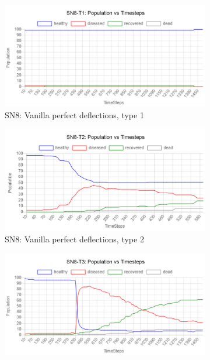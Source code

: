 \documentclass[a4paper,11pt]{article}
\begin{document}
    \begin{figure}[H]
        \centering
        \begin{subfigure}[b]{0.49\linewidth}
            \includegraphics[width=\linewidth]{pop_graphs/SN8-T1_pop.jpg}
            \caption{SN8: Vanilla perfect deflections, type 1}
            \label{fig:SN8T1}
        \end{subfigure}
        \begin{subfigure}[b]{0.49\linewidth}
            \includegraphics[width=\linewidth]{pop_graphs/SN8-T2_pop.jpg}
            \caption{SN8: Vanilla perfect deflections, type 2}
            \label{fig:SN8T2}
        \end{subfigure}
        \begin{subfigure}[b]{0.49\linewidth}
            \includegraphics[width=\linewidth]{pop_graphs/SN8-T3_pop.jpg}

\end{subfigure}
\end{figure}
\end{document}
